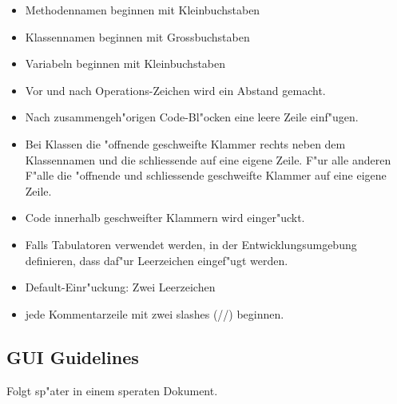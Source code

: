 \begin{itemize}
  \item Methodennamen beginnen mit Kleinbuchstaben
  \item Klassennamen beginnen mit Grossbuchstaben
  \item Variabeln beginnen mit Kleinbuchstaben
  \item Vor und nach Operations-Zeichen wird ein Abstand gemacht.
  \item Nach zusammengeh"origen Code-Bl"ocken eine leere Zeile einf"ugen.
  \item Bei Klassen die "offnende geschweifte Klammer rechts neben dem Klassennamen und die schliessende auf eine eigene Zeile.
        F"ur alle anderen F"alle die "offnende und schliessende geschweifte Klammer auf eine eigene Zeile.
  \item Code innerhalb geschweifter Klammern wird einger"uckt.
  \item Falls Tabulatoren verwendet werden, in der Entwicklungsumgebung definieren, dass daf"ur Leerzeichen eingef"ugt werden.
  \item Default-Einr"uckung: Zwei Leerzeichen
  \item jede Kommentarzeile mit zwei slashes (//) beginnen.
\end{itemize}

\subsection{GUI Guidelines}
Folgt sp"ater in einem speraten Dokument.
